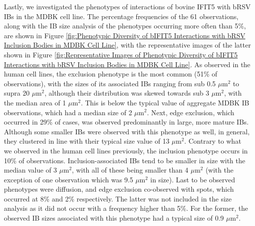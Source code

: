 Lastly, we investigated the phenotypes of interactions of bovine IFIT5 with bRSV IBs in the MDBK cell line. The percentage frequencies of the 61 observations, along with the IB size analysis of the phenotypes occurring more often than 5\%, are shown in Figure \ref{fig:Phenotypic Diversity of bIFIT5 Interactions with bRSV Inclusion Bodies in MDBK Cell Line}, with the representative images of the latter shown in Figure \ref{fig:Representative Images of Phenotypic Diversity of bIFIT5 Interactions with bRSV Inclusion Bodies in MDBK Cell Line}. As observed in the human cell lines, the exclusion phenotype is the most common (51\% of observations), with the sizes of its associated IBs ranging from sub 0.5 \(\mu \mbox{m}^2\) to supra 20 \(\mu \mbox{m}^2\), although their distribution was skewed towards sub 3 \(\mu \mbox{m}^2\), with the median area of 1 \(\mu \mbox{m}^2\). This is below the typical value of aggregate MDBK IB observations, which had a median size of 2 \(\mu \mbox{m}^2\). Next, edge exclusion, which occurred in 29\% of cases, was observed predominantly in large, more mature IBs. Although some smaller IBs were observed with this phenotype as well, in general, they clustered in line with their typical size value of 13 \(\mu \mbox{m}^2\). Contrary to what we observed in the human cell lines previously, the inclusion phenotype occurs in 10\% of observations. Inclusion-associated IBs tend to be smaller in size with the median value of 3 \(\mu \mbox{m}^2\), with all of these being smaller than 4 \(\mu \mbox{m}^2\) (with the exception of one observation which was 9.5 \(\mu \mbox{m}^2\) in size). Last to be observed phenotypes were diffusion, and edge exclusion co-observed with spots, which occurred at 8\% and 2\% respectively. The latter was not included in the size analysis as it did not occur with a frequency higher than 5\%. For the former, the observed IB sizes associated with this phenotype had a typical size of 0.9 \(\mu \mbox{m}^2\).

